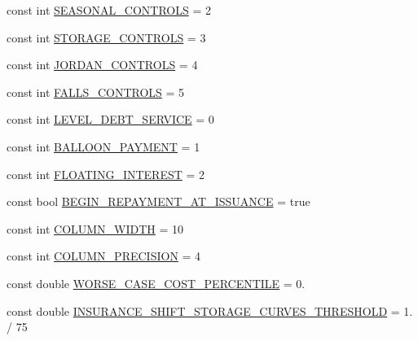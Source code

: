 \begin{DoxyCompactItemize}
\item 
const int \mbox{\hyperlink{namespaceConstants_a8e78b56c12f7896c4b1f225503172634_a8e78b56c12f7896c4b1f225503172634}{S\+E\+A\+S\+O\+N\+A\+L\+\_\+\+C\+O\+N\+T\+R\+O\+LS}} = 2
\item 
const int \mbox{\hyperlink{namespaceConstants_ae986af9edd51d442ce78589435ddbf0b_ae986af9edd51d442ce78589435ddbf0b}{S\+T\+O\+R\+A\+G\+E\+\_\+\+C\+O\+N\+T\+R\+O\+LS}} = 3
\item 
const int \mbox{\hyperlink{namespaceConstants_ae35241b436f7a539f367f08b0f9fa9f1_ae35241b436f7a539f367f08b0f9fa9f1}{J\+O\+R\+D\+A\+N\+\_\+\+C\+O\+N\+T\+R\+O\+LS}} = 4
\item 
const int \mbox{\hyperlink{namespaceConstants_a9ced0b193590ae665ccefc280837464d_a9ced0b193590ae665ccefc280837464d}{F\+A\+L\+L\+S\+\_\+\+C\+O\+N\+T\+R\+O\+LS}} = 5
\item 
const int \mbox{\hyperlink{namespaceConstants_a4b19c9668b1dd7c3cf77b16029fe3cac_a4b19c9668b1dd7c3cf77b16029fe3cac}{L\+E\+V\+E\+L\+\_\+\+D\+E\+B\+T\+\_\+\+S\+E\+R\+V\+I\+CE}} = 0
\item 
const int \mbox{\hyperlink{namespaceConstants_a08c9220e91237a5b58d648fb4298833c_a08c9220e91237a5b58d648fb4298833c}{B\+A\+L\+L\+O\+O\+N\+\_\+\+P\+A\+Y\+M\+E\+NT}} = 1
\item 
const int \mbox{\hyperlink{namespaceConstants_aaa7f6235ee94070b06f049654312a63e_aaa7f6235ee94070b06f049654312a63e}{F\+L\+O\+A\+T\+I\+N\+G\+\_\+\+I\+N\+T\+E\+R\+E\+ST}} = 2
\item 
const bool \mbox{\hyperlink{namespaceConstants_a603925d07357a01d9531549e46b2936c_a603925d07357a01d9531549e46b2936c}{B\+E\+G\+I\+N\+\_\+\+R\+E\+P\+A\+Y\+M\+E\+N\+T\+\_\+\+A\+T\+\_\+\+I\+S\+S\+U\+A\+N\+CE}} = true
\item 
const int \mbox{\hyperlink{namespaceConstants_ab7a5abf9228bcce4babf9a84cd66deb1_ab7a5abf9228bcce4babf9a84cd66deb1}{C\+O\+L\+U\+M\+N\+\_\+\+W\+I\+D\+TH}} = 10
\item 
const int \mbox{\hyperlink{namespaceConstants_a52f7a9d94123775aa42a979c4c97dc71_a52f7a9d94123775aa42a979c4c97dc71}{C\+O\+L\+U\+M\+N\+\_\+\+P\+R\+E\+C\+I\+S\+I\+ON}} = 4
\item 
const double \mbox{\hyperlink{namespaceConstants_af0f5a11d2e7941b6c85ea1b8034d3996_af0f5a11d2e7941b6c85ea1b8034d3996}{W\+O\+R\+S\+E\+\_\+\+C\+A\+S\+E\+\_\+\+C\+O\+S\+T\+\_\+\+P\+E\+R\+C\+E\+N\+T\+I\+LE}} = 0.
\item 
const double \mbox{\hyperlink{namespaceConstants_a40ab8dd088d886af9b5795c6b9db22ca_a40ab8dd088d886af9b5795c6b9db22ca}{I\+N\+S\+U\+R\+A\+N\+C\+E\+\_\+\+S\+H\+I\+F\+T\+\_\+\+S\+T\+O\+R\+A\+G\+E\+\_\+\+C\+U\+R\+V\+E\+S\+\_\+\+T\+H\+R\+E\+S\+H\+O\+LD}} = 1. / 75

\end{DoxyCompactItemize}
